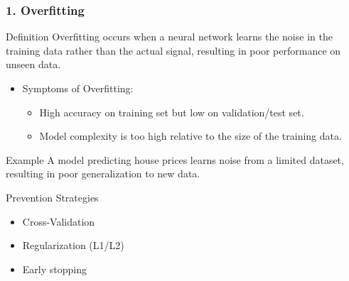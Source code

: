 \documentclass[aspectratio=169]{beamer}
\begin{document}
\begin{frame}[fragile]
    \frametitle{1. Overfitting}
    \begin{block}{Definition}
        Overfitting occurs when a neural network learns the noise in the training data rather than the actual signal, resulting in poor performance on unseen data.
    \end{block}
    \begin{itemize}
        \item Symptoms of Overfitting:
        \begin{itemize}
            \item High accuracy on training set but low on validation/test set.
            \item Model complexity is too high relative to the size of the training data.
        \end{itemize}
    \end{itemize}
    \begin{block}{Example}
        A model predicting house prices learns noise from a limited dataset, resulting in poor generalization to new data.
    \end{block}
    \begin{block}{Prevention Strategies}
        \begin{itemize}
            \item Cross-Validation
            \item Regularization (L1/L2)
            \item Early stopping
        \end{itemize}
    \end{block}
\end{frame}
\end{document}
